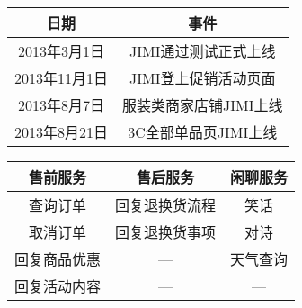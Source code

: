 


\begin{table*}[h]

\parbox[t]{0.5\textwidth}{
\centering
\caption{\label{table:jimi-event} “JIMI”主要上线事件}

\begin{tabular}{cc}
\toprule
日期  &   事件  \\
\midrule
2013年3月1日    &   JIMI通过测试正式上线\\
2013年11月1日   &   JIMI登上促销活动页面\\
2013年8月7日    &   服装类商家店铺JIMI上线\\
2013年8月21日   &   3C全部单品页JIMI上线\\
\bottomrule
\end{tabular}

}
\parbox[t]{0.5\textwidth}{
\centering
\caption{\label{table:jimi-ability} “JIMI”产品能力}

\begin{tabular}{ccc}
\toprule
售前服务 &  售后服务  &   闲聊服务\\
\midrule
查询订单    &  回复退换货流程  &   笑话\\
取消订单    &  回复退换货事项   &   对诗\\
回复商品优惠  &   —  &   天气查询\\
回复活动内容  &   —  &   —\\
\bottomrule
\end{tabular}
}

\end{table*}